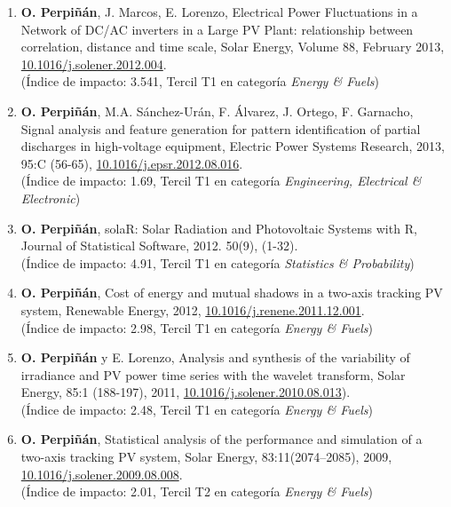 \documentclass[article, a4paper]{memoir}
\begin{document}
\begin{enumerate}
\item \textbf{O. Perpiñán}, J. Marcos, E. Lorenzo, Electrical Power Fluctuations in a Network of DC/AC inverters in a Large PV Plant: relationship between correlation, distance and time scale, Solar Energy, Volume 88, February 2013, \href{http://dx.doi.org/10.1016/j.solener.2012.12.004}{10.1016/j.solener.2012.004}. \\ (Índice de impacto: 3.541, Tercil T1 en categoría \emph{Energy \& Fuels})

\item \textbf{O. Perpiñán}, M.A. Sánchez-Urán, F. Álvarez, J. Ortego, F. Garnacho, Signal analysis and feature generation for pattern identification of partial discharges in high-voltage equipment, Electric Power Systems Research, 2013, 95:C (56-65), \href{http://dx.doi.org/10.1016/j.epsr.2012.08.016}{10.1016/j.epsr.2012.08.016}.\\ (Índice de impacto: 1.69, Tercil T1 en categoría \emph{Engineering, Electrical \& Electronic})

\item \textbf{O. Perpiñán}, solaR: Solar Radiation and Photovoltaic Systems with R, Journal of Statistical Software, 2012. 50(9), (1-32). \\ (Índice de impacto: 4.91, Tercil T1 en categoría \emph{Statistics \& Probability})

\item \textbf{O. Perpiñán}, Cost of energy and mutual shadows in a two-axis tracking PV system, Renewable Energy, 2012, \href{http://dx.doi.org/10.1016/j.renene.2011.12.001}{10.1016/j.renene.2011.12.001}. \\ (Índice de impacto: 2.98, Tercil T1 en categoría \emph{Energy \& Fuels})

\item \textbf{O. Perpiñán} y E. Lorenzo, Analysis and synthesis of the variability of irradiance and PV power time series with the wavelet transform, Solar Energy, 85:1 (188-197), 2011, \href{http://dx.doi.org/10.1016/j.solener.2010.08.013}{10.1016/j.solener.2010.08.013}).\\ (Índice de impacto: 2.48, Tercil T1 en categoría \emph{Energy \& Fuels})

\item \textbf{O. Perpiñán}, Statistical analysis of the performance and simulation of a two-axis tracking PV system, Solar Energy, 83:11(2074–2085), 2009, \href{http://dx.doi.org/10.1016/j.solener.2009.08.008}{10.1016/j.solener.2009.08.008}. \\(Índice de impacto: 2.01, Tercil T2 en categoría \emph{Energy \& Fuels})


\end{enumerate}
\end{document}
